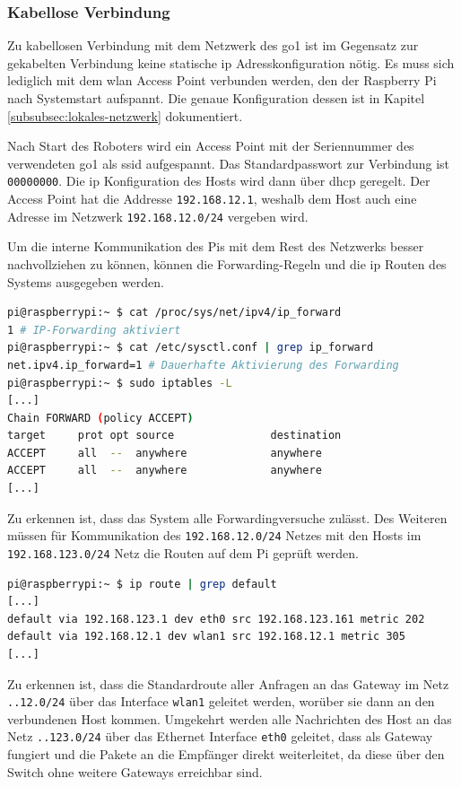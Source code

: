 \subsubsection{Kabellose Verbindung}

Zu kabellosen Verbindung mit dem Netzwerk des \gls{go1} ist im Gegensatz zur gekabelten Verbindung keine statische \gls{ip}
Adresskonfiguration nötig.
Es muss sich lediglich mit dem \gls{wlan} Access Point verbunden werden, den der Raspberry Pi nach Systemstart aufspannt.
Die genaue Konfiguration dessen ist in Kapitel \ref{subsubsec:lokales-netzwerk} dokumentiert.

Nach Start des Roboters wird ein Access Point mit der Seriennummer des verwendeten \gls{go1} als \gls{ssid} aufgespannt.
Das Standardpasswort zur Verbindung ist \texttt{00000000}.
Die \gls{ip} Konfiguration des Hosts wird dann über \gls{dhcp} geregelt.
Der Access Point hat die Addresse \texttt{192.168.12.1}, weshalb dem Host auch eine Adresse im Netzwerk
\texttt{192.168.12.0/24} vergeben wird.

Um die interne Kommunikation des Pis mit dem Rest des Netzwerks besser nachvollziehen zu können, können die Forwarding-Regeln
und die \gls{ip} Routen des Systems ausgegeben werden.

\begin{lstlisting}[language=Bash]
pi@raspberrypi:~ $ cat /proc/sys/net/ipv4/ip_forward
1 # IP-Forwarding aktiviert
pi@raspberrypi:~ $ cat /etc/sysctl.conf | grep ip_forward
net.ipv4.ip_forward=1 # Dauerhafte Aktivierung des Forwarding
pi@raspberrypi:~ $ sudo iptables -L
[...]
Chain FORWARD (policy ACCEPT)
target     prot opt source               destination
ACCEPT     all  --  anywhere             anywhere
ACCEPT     all  --  anywhere             anywhere
[...]
\end{lstlisting}

\noindent Zu erkennen ist, dass das System alle Forwardingversuche zulässt.
Des Weiteren müssen für Kommunikation des \texttt{192.168.12.0/24} Netzes mit den Hosts im \texttt{192.168.123.0/24} Netz
die Routen auf dem Pi geprüft werden.

\begin{lstlisting}[language=Bash]
pi@raspberrypi:~ $ ip route | grep default
[...]
default via 192.168.123.1 dev eth0 src 192.168.123.161 metric 202
default via 192.168.12.1 dev wlan1 src 192.168.12.1 metric 305
[...]
\end{lstlisting}

\noindent Zu erkennen ist, dass die Standardroute aller Anfragen an das Gateway im Netz \texttt{..12.0/24} über das
Interface \texttt{wlan1} geleitet werden, worüber sie dann an den verbundenen Host kommen.
Umgekehrt werden alle Nachrichten des Host an das Netz \texttt{..123.0/24} über das Ethernet Interface \texttt{eth0}
geleitet, dass als Gateway fungiert und die Pakete an die Empfänger direkt weiterleitet, da diese über den Switch ohne
weitere Gateways erreichbar sind.

